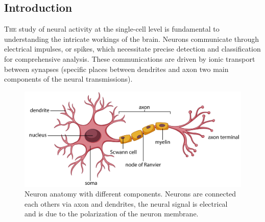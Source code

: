 \documentclass[11pt,a4paper]{report}
\begin{document}
\newpage
\tableofcontents
\newpage
\begin{center}
    \vspace*{1cm}
    \fontsize{11}{13 }\selectfont

    \begin{minipage}{.75\linewidth}
        \chapter{Introduction}

        \lettrine[lines=3]{\color{black} T}{he} study of neural activity at the single-cell level is fundamental to understanding the intricate workings of the brain. Neurons communicate through electrical impulses, or spikes, which necessitate precise detection and classification for comprehensive analysis. These communications are driven by ionic transport between synapses (specific places between dendrites and axon two main components of the neural transmissions).

        \begin{figure}[H]
            \begin{center}
                \hspace*{-1cm}\includegraphics[width=.8\linewidth]{./figure/neuron_anat.jpg}
            \end{center}
            \caption{Neuron anatomy with different components. Neurons are connected each others via axon and dendrites, the neural signal is
                electrical and is due to the polarization of the neuron membrane.}
            \label{fig:}
        \end{figure}



\end{minipage}
\end{center}
\end{document}
